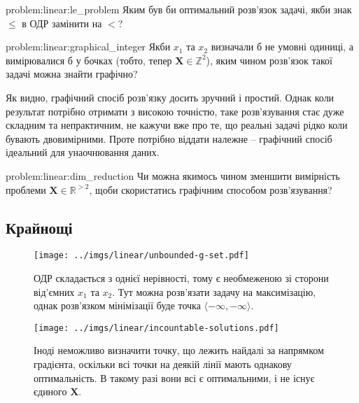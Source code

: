 \documentclass[\main/book.tex]{subfiles}
\begin{document}
\begin{problem}{problem:linear:le_problem}
 Яким був би оптимальний розв'язок задачі, якби знак \flqq{}$\leq$\frqq{} в ОДР замінити на \flqq$<$\frqq?
\end{problem}

\begin{problem}{problem:linear:graphical_integer}
 Якби $x_1$ та $x_2$ визначали б не умовні одиниці, а вимірювалися б у бочках (тобто, тепер $\mathbf{X} \in \mathbb{Z}^2$), яким чином розв'язок такої задачі можна знайти графічно?
\end{problem}

Як видно, графічний спосіб розв'язку досить зручний і простий. Однак коли результат потрібно отримати з високою точністю, таке роз\-в'я\-зу\-ван\-ня стає дуже складним та непрактичним, не кажучи вже про те, що реальні задачі рідко коли бувають двовимірними. Проте потрібно віддати належне -- графічний спосіб ідеальний для унаочнювання даних.

\begin{problem}{problem:linear:dim_reduction}
 Чи можна якимось чином зменшити вимірність проблеми ${\mathbf{X} \in \mathbb{R}^{> 2}}$, щоби скористатись графічним способом розв'язування?
\end{problem}


\subsection{Крайнощі}

\begin{figure*}
\centering
\begin{minipage}[t]{.47\textwidth}
 \texttt{[image: ../imgs/linear/unbounded-g-set.pdf]}
 \caption{ОДР складається з однієї нерівності, тому є необмеженою зі сторони від'ємних $x_1$ та $x_2$. Тут можна розв'язати задачу на максимізацію, однак розв'язком мінімізації буде точка $\langle -\infty, -\infty \rangle$.}
 \label{pic:linear:unbounded_g_set}
\end{minipage}\qquad
\begin{minipage}[t]{.47\textwidth}
 \texttt{[image: ../imgs/linear/incountable-solutions.pdf]}
 \caption{Іноді неможливо визначити точку, що лежить найдалі за напрямком градієнта, оскільки всі точки на деякій лінії мають однакову оптимальність. В такому разі вони всі є оптимальними, і не існує єдиного $\mathbf{X}$.}
 \label{pic:linear:incountable_solutions}
\end{minipage}
\end{figure*}
\end{document}
